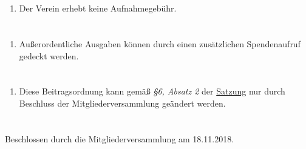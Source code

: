 \documentclass[10pt,conference,a4paper,onecolumn,nofonttune]{IEEEtran}
\begin{document}
\section{}
\begin{enumerate}
  \item Der Verein erhebt keine Aufnahmegebühr.
\end{enumerate}


\section{}
\begin{enumerate}
  \item Außerordentliche Ausgaben können durch einen zusätzlichen Spendenaufruf
    gedeckt werden.
\end{enumerate}


\section{}
\begin{enumerate}
  \item Diese Beitragsordnung kann gemäß \textit{\S 6, Absatz 2} der
    \href{https://hsmr.cc/uploads/Verein/Satzung.pdf}{Satzung}
    nur durch Beschluss der Mitgliederversammlung geändert werden.
\end{enumerate}


\section*{}
Beschlossen durch die Mitgliederversammlung am 18.11.2018.
\end{document}
